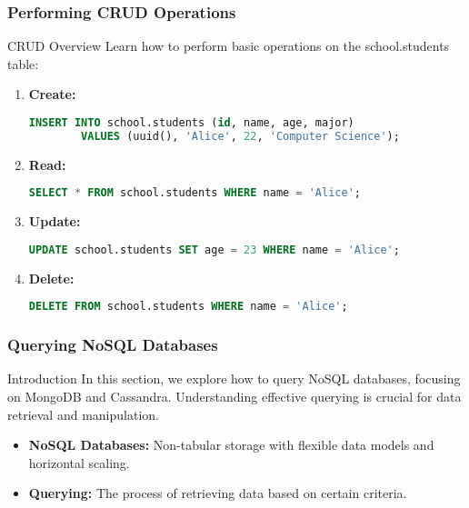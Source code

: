 \documentclass[aspectratio=169]{beamer}
\begin{document}
\begin{frame}[fragile]
    \frametitle{Performing CRUD Operations}
    \begin{block}{CRUD Overview}
        Learn how to perform basic operations on the school.students table:
    \end{block}
    
    \begin{enumerate}
        \item \textbf{Create:}
        \begin{lstlisting}[language=sql]
        INSERT INTO school.students (id, name, age, major) 
        VALUES (uuid(), 'Alice', 22, 'Computer Science');
        \end{lstlisting}
        
        \item \textbf{Read:}
        \begin{lstlisting}[language=sql]
        SELECT * FROM school.students WHERE name = 'Alice';
        \end{lstlisting}
        
        \item \textbf{Update:}
        \begin{lstlisting}[language=sql]
        UPDATE school.students SET age = 23 WHERE name = 'Alice';
        \end{lstlisting}
        
        \item \textbf{Delete:}
        \begin{lstlisting}[language=sql]
        DELETE FROM school.students WHERE name = 'Alice';
        \end{lstlisting}
    \end{enumerate}
\end{frame}

\begin{frame}
    \frametitle{Querying NoSQL Databases}
    \begin{block}{Introduction}
        In this section, we explore how to query NoSQL databases, focusing on MongoDB and Cassandra.
        Understanding effective querying is crucial for data retrieval and manipulation.
    \end{block}
    
    \begin{itemize}
        \item \textbf{NoSQL Databases:} Non-tabular storage with flexible data models and horizontal scaling.
        \item \textbf{Querying:} The process of retrieving data based on certain criteria.
    \end{itemize}
\end{frame}
\end{document}
